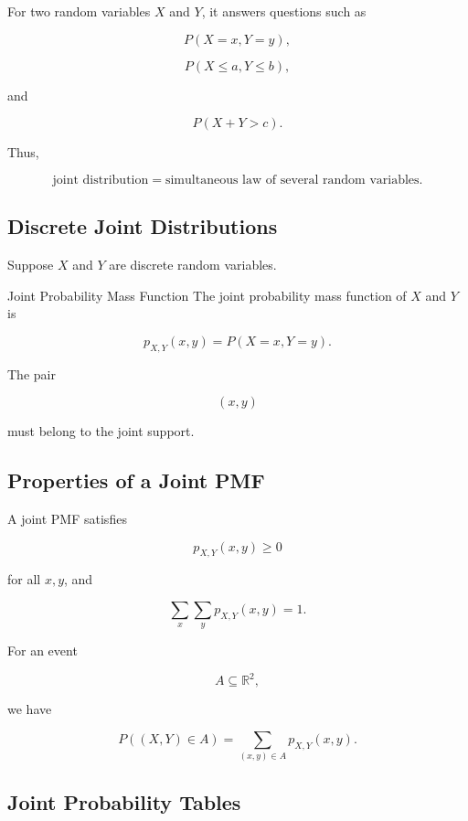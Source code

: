 For two random variables \(X\) and \(Y\), it answers questions such as

\[
P(X=x,Y=y),
\]

\[
P(X\leq a,Y\leq b),
\]

and

\[
P(X+Y>c).
\]

Thus,

\[
\boxed{
\text{joint distribution}
=
\text{simultaneous law of several random variables}.
}
\]

\subsection{Discrete Joint Distributions}
\label{subsec:discrete-joint-distributions}

Suppose \(X\) and \(Y\) are discrete random variables.

\begin{definitionbox}{Joint Probability Mass Function}
The joint probability mass function of \(X\) and \(Y\) is

\[
\boxed{
p_{X,Y}(x,y)
=
P(X=x,Y=y).
}
\]
\end{definitionbox}

The pair

\[
(x,y)
\]

must belong to the joint support.

\subsection{Properties of a Joint PMF}
\label{subsec:joint-pmf-properties}

A joint PMF satisfies

\[
\boxed{
p_{X,Y}(x,y)\geq0
}
\]

for all \(x,y\), and

\[
\boxed{
\sum_x\sum_y
p_{X,Y}(x,y)
=
1.
}
\]

For an event

\[
A\subseteq\mathbb{R}^2,
\]

we have

\[
\boxed{
P((X,Y)\in A)
=
\sum_{(x,y)\in A}
p_{X,Y}(x,y).
}
\]

\subsection{Joint Probability Tables}
\label{subsec:joint-probability-tables}

